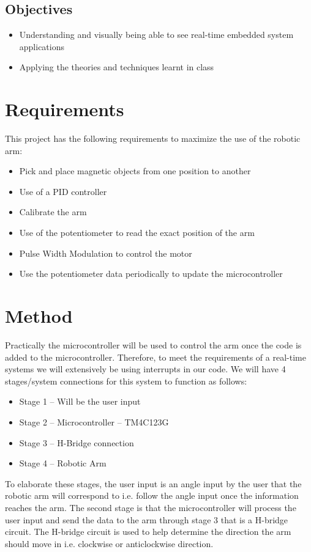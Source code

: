 \documentclass[12pt]{article}
\begin{document}
\subsection{Objectives}
\begin{itemize}
    \item Understanding and visually being able to see real-time embedded system applications
    \item Applying the theories and techniques learnt in class
\end{itemize}
\section{Requirements}
This project has the following requirements to maximize the use of the robotic arm:
\begin{itemize}
    \item Pick and place magnetic objects from one position to another
    \item Use of a PID controller
    \item Calibrate the arm
    \item Use of the potentiometer to read the exact position of the arm
    \item Pulse Width Modulation to control the motor
    \item Use the potentiometer data periodically to update the microcontroller
\end{itemize}
\section{Method}
Practically the microcontroller will be used to control the arm once the code is added to the microcontroller. Therefore, to meet the requirements of a real-time systems we will extensively be using interrupts in our code. We will have 4 stages/system connections for this system to function as follows:
\begin{itemize}
    \item Stage 1 – Will be the user input
    \item Stage 2 – Microcontroller – TM4C123G
    \item Stage 3 – H-Bridge connection
    \item Stage 4 – Robotic Arm
\end{itemize}
To elaborate these stages, the user input is an angle input by the user that the robotic arm will correspond to i.e. follow the angle input once the information reaches the arm. The second stage is that the microcontroller will process the user input and send the data to the arm through stage 3 that is a H-bridge circuit. The H-bridge circuit is used to help determine the direction the arm should move in i.e. clockwise or anticlockwise direction.
\end{document}

